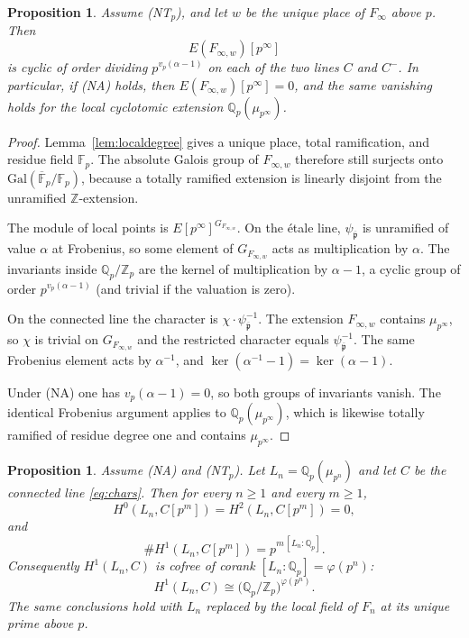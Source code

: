 \documentclass[11pt]{article}
\newtheorem{proposition}[theorem]{Proposition}
\theoremstyle{definition}
\theoremstyle{remark}
\newcommand{\Z}{\mathbb{Z}}
\newcommand{\Q}{\mathbb{Q}}
\newcommand{\F}{\mathbb{F}}
\newcommand{\Gal}{\mathrm{Gal}}
\newcommand{\ppb}{\overline{\mathfrak{p}}}
\begin{document}
\begin{proposition}
\label{prop:localtors}
Assume \textup{(NT\(_p\))}, and let \(w\) be the unique place of \(F_\infty\) above \(p\). Then
\[
E(F_{\infty,w})[p^\infty]
\]
is cyclic of order dividing \(p^{v_p(\alpha-1)}\) on each of the two lines \(C\) and \(C^-\). In particular, if \textup{(NA)} holds, then \(E(F_{\infty,w})[p^\infty]=0\), and the same vanishing holds for the local cyclotomic extension \(\Q_p(\mu_{p^\infty})\).
\end{proposition}

\begin{proof}
Lemma~\ref{lem:localdegree} gives a unique place, total ramification, and residue field \(\F_p\). The absolute Galois group of \(F_{\infty,w}\) therefore still surjects onto \(\Gal(\overline{\F}_p/\F_p)\), because a totally ramified extension is linearly disjoint from the unramified \(\Z\)-extension.

The module of local points is \(E[p^\infty]^{G_{F_{\infty,w}}}\). On the \'etale line, \(\psi_{\ppb}\) is unramified of value \(\alpha\) at Frobenius, so some element of \(G_{F_{\infty,w}}\) acts as multiplication by \(\alpha\). The invariants inside \(\Q_p/\Z_p\) are the kernel of multiplication by \(\alpha-1\), a cyclic group of order \(p^{v_p(\alpha-1)}\) (and trivial if the valuation is zero).

On the connected line the character is \(\chi\cdot\psi_{\ppb}^{-1}\). The extension \(F_{\infty,w}\) contains \(\mu_{p^\infty}\), so \(\chi\) is trivial on \(G_{F_{\infty,w}}\) and the restricted character equals \(\psi_{\ppb}^{-1}\). The same Frobenius element acts by \(\alpha^{-1}\), and \(\ker(\alpha^{-1}-1)=\ker(\alpha-1)\).

Under (NA) one has \(v_p(\alpha-1)=0\), so both groups of invariants vanish. The identical Frobenius argument applies to \(\Q_p(\mu_{p^\infty})\), which is likewise totally ramified of residue degree one and contains \(\mu_{p^\infty}\).
\end{proof}

\begin{proposition}
\label{prop:localH1}
Assume \textup{(NA)} and \textup{(NT\(_p\))}. Let \(L_n=\Q_p(\mu_{p^n})\) and let \(C\) be the connected line \eqref{eq:chars}. Then for every \(n\ge 1\) and every \(m\ge 1\),
\[
H^0(L_n,C[p^m])=H^2(L_n,C[p^m])=0,
\]
and
\[
\# H^1(L_n,C[p^m]) = p^{m\,[L_n:\Q_p]}.
\]
Consequently \(H^1(L_n,C)\) is cofree of corank \([L_n:\Q_p]=\varphi(p^n)\):
\[
H^1(L_n,C)\cong\bigl(\Q_p/\Z_p\bigr)^{\varphi(p^n)}.
\]
The same conclusions hold with \(L_n\) replaced by the local field of \(F_n\) at its unique prime above \(p\).
\end{proposition}
\end{document}
